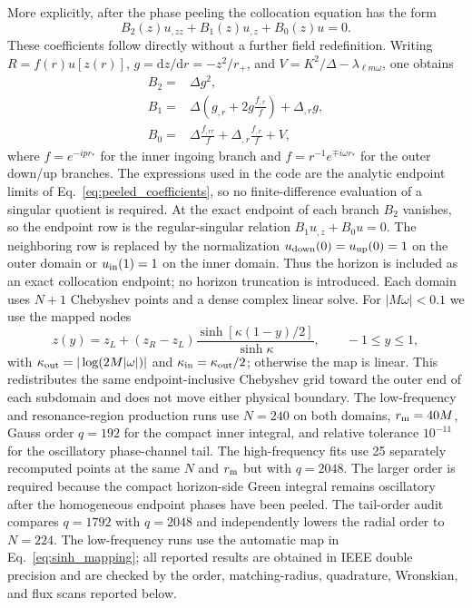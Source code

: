 \documentclass[aps,prd,twocolumn,10pt,nofootinbib,superscriptaddress,floatfix]{revtex4-2}
\newcommand{\dd}{\mathrm{d}}
\begin{document}
More explicitly, after the phase peeling the collocation equation has the
form
\begin{equation}
 B_2(z)u_{,zz}+B_1(z)u_{,z}+B_0(z)u=0 .
\label{eq:peeled_matrix_equation}
\end{equation}
These coefficients follow directly without a further field redefinition.
Writing $R=f(r)u[z(r)]$, $g=\dd z/\dd r=-z^2/r_+$, and
$V=K^2/\Delta-\lambda_{\ell m\omega}$, one obtains
\begin{align}
B_2={}&\Delta g^2,\nonumber\\
B_1={}&\Delta\left(g_{,r}+2g\frac{f_{,r}}{f}\right)
       +\Delta_{,r}g,\nonumber\\
B_0={}&\Delta\frac{f_{,rr}}{f}
       +\Delta_{,r}\frac{f_{,r}}{f}+V,
\label{eq:peeled_coefficients}
\end{align}
where $f=e^{-ipr_*}$ for the inner ingoing branch and
$f=r^{-1}e^{\mp i\omega r_*}$ for the outer down/up branches.  The
expressions used in the code are the analytic endpoint limits of
Eq.~\eqref{eq:peeled_coefficients}, so no finite-difference evaluation of a
singular quotient is required.
At the exact endpoint of each branch $B_2$ vanishes, so the endpoint row is
the regular-singular relation
$B_1u_{,z}+B_0u=0$.  The neighboring row is replaced by the normalization
$u_{\rm down}(0)=u_{\rm up}(0)=1$ on the outer domain or
$u_{\rm in}(1)=1$ on the inner domain.  Thus the horizon is included as an
exact collocation endpoint; no horizon truncation is introduced.  Each domain
uses $N+1$ Chebyshev points and a dense complex linear solve.  For
$|M\omega|<0.1$ we use the mapped nodes
\begin{equation}
z(y)=z_L+(z_R-z_L)
\frac{\sinh[\kappa(1-y)/2]}{\sinh\kappa},
\qquad -1\le y\le1,
\label{eq:sinh_mapping}
\end{equation}
with $\kappa_{\rm out}=|\log(2M|\omega|)|$ and
$\kappa_{\rm in}=\kappa_{\rm out}/2$; otherwise the map is linear.  This
redistributes the same endpoint-inclusive Chebyshev grid toward the outer end
of each subdomain and does not move either physical boundary.  The low-frequency
and resonance-region production runs use $N=240$ on both domains,
$r_{\rm m}=40M$, Gauss order $q=192$ for the compact inner integral, and
relative tolerance $10^{-11}$ for the oscillatory phase-channel tail.  The
high-frequency fits use 25 separately recomputed points at the same $N$ and
$r_{\rm m}$ but with $q=2048$.  The larger order is required because the
compact horizon-side Green integral remains oscillatory after the homogeneous
endpoint phases have been peeled.  The tail-order audit compares $q=1792$
with $q=2048$ and independently lowers the radial order to $N=224$.  The
low-frequency runs use the automatic map in Eq.~\eqref{eq:sinh_mapping}; all
reported results are obtained in IEEE double precision
and are checked by the order, matching-radius, quadrature, Wronskian, and flux
scans reported below.
\end{document}
